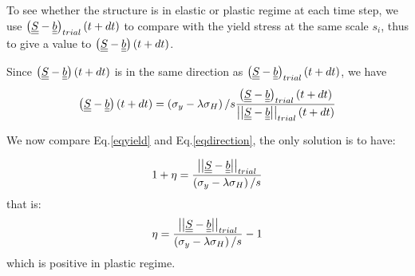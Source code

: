 To see whether the structure is in elastic or plastic regime at each time step, we use $\left( \uline{\uline{S}}-\uline{\uline{b}}\right)_{trial}(t+dt)$ to compare with the yield stress at the same scale $s_i$, thus to give a value to $\left( \uline{\uline{S}}-\uline{\uline{b}}\right)(t+dt)$.

Since $\left( \uline{\uline{S}}-\uline{\uline{b}}\right)(t+dt)$ is in the same direction as $\left( \uline{\uline{S}}-\uline{\uline{b}}\right)_{trial}(t+dt)$, we have
\begin{equation}\left( \uline{\uline{S}}-\uline{\uline{b}}\right) (t+dt)= \left( \sigma_y-\lambda \sigma_H\right)/s\dfrac{\left( \uline{\uline{S}}-\uline{\uline{b}}\right)_{trial}(t+dt)}{\left| \left|\uline{\uline{S}}-\uline{\uline{b}}\right| \right|_{trial}(t+dt)}
\label{eqdirection}\end{equation}

We now compare Eq.\eqref{eqyield} and Eq.\eqref{eqdirection}, the only solution is to have:

\begin{equation}
1+\eta=\dfrac{\left| \left|\uline{\uline{S}}-\uline{\uline{b}}\right| \right|_{trial}}{\left( \sigma_y-\lambda \sigma_H\right)/s}
\end{equation}
that is:
\begin{equation}
\eta=\dfrac{\left| \left|\uline{\uline{S}}-\uline{\uline{b}}\right| \right|_{trial}}{\left( \sigma_y-\lambda \sigma_H\right)/s}-1
\label{eta2}
\end{equation}
which is positive in plastic regime.
